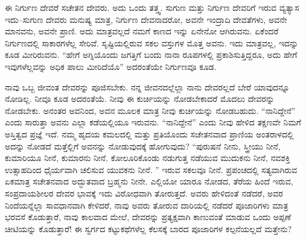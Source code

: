 \newpage

ಈ ನಿರ್ಗುಣ ದೇವರೆ ಸಚೇತನ ದೇವರು. ಅದು ಒಂದು ತತ್ತ್ವ. ಸುಗುಣ ಮತ್ತು ನಿರ್ಗುಣ ದೇವರಿಗೆ ಇರುವ ವ್ಯತ್ಯಾಸ ಇದು–ಸುಗುಣ ದೇವರು ಮನುಷ್ಯ ಮಾತ್ರ, ನಿರ್ಗುಣ ದೇವನಾದರೋ, ಅವನೇ ಇಂದ್ರಾದಿ ದೇವತೆಗಳು, ಅವನೇ ಮಾನವನು, ಅವನೇ ಪ್ರಾಣಿ. ಅದು ಮಾತ್ರವಲ್ಲದೆ ನಮಗೆ ಕಾಣದ ಇನ್ನು ಏನೇನೋ ಆಗಿರುವನು. ಏಕೆಂದರೆ ನಿರ್ಗುಣದಲ್ಲಿ ಸಾಕಾರಗಳೆಲ್ಲ ಸೇರಿವೆ. ಸೃಷ್ಟಿಯಲ್ಲಿರುವ ಸಕಲ ವಸ್ತುಗಳ ಮೊತ್ತ ಅವನು. ಇದು ಮಾತ್ರವಲ್ಲ, ಇದನ್ನು ಕೂಡ ಮೀರಿರುವನು. “ಹೇಗೆ ಅಗ್ನಿಯೊಂದು ಜಗತ್ತಿಗೆ ಬಂದು ನಾನಾ ರೂಪಗಳಲ್ಲಿ ಪ್ರಕಾಶಿಸುತ್ತಿದ್ದರೂ, ಅದು ಹೇಗೆ ಇವುಗಳೆಲ್ಲವನ್ನು ಅಧಿಕ ಪಾಲು ಮೀರಿದೆಯೊ” ಅದರಂತೆಯೇ ನಿರ್ಗುಣವೂ ಕೂಡ. 

\vskip 6pt

ನಾವು ಒಬ್ಬ ಜೀವಂತ ದೇವರನ್ನು ಪೂಜಿಸಬೇಕು. ನನ್ನ ಜೀವನದಲ್ಲೆಲ್ಲಾ ನಾನು ದೇವರಲ್ಲದೆ ಬೇರೆ ಯಾವುದನ್ನೂ ನೋಡಿಲ್ಲ. ನೀವೂ ಕೂಡ ಅದರಂತೆಯೆ. ನೀವು ಈ ಕುರ್ಚಿಯನ್ನು ನೋಡಬೇಕಾದರೆ ಮೊದಲು ದೇವರನ್ನು ನೋಡಬೇಕು. ಅನಂತರ ಅವನಿಂದ, ಅವನ ಮೂಲಕ ಮಾತ್ರ ನೀವು ಕುರ್ಚಿಯನ್ನು ನೋಡಬಹುದು. “ನಾನಿದ್ದೇನೆ” ಎಂದು ಸಾರುತ್ತಾ ಅವನು ಎಲ್ಲಾ ಕಡೆಯಲ್ಲಿಯೂ ಇರುವನು. “ನಾನಿದ್ದೇನೆ” ಎಂದು ನೀವು ಹೇಳಿದ ತಕ್ಷಣವೇ ನಿಮಗೆ ಅಸ್ತಿತ್ವದ ಪ್ರಜ್ಞೆ ಇದೆ. ನಮ್ಮ ಹೃದಯ ಕಮಲದಲ್ಲಿ ಮತ್ತು ಪ್ರತಿಯೊಂದು ಸಚೇತನವಾದ ಪ್ರಾಣಿಯ ಅಂತರಾಳದಲ್ಲಿ ಅದನ್ನು ನೋಡದೆ ಮತ್ತೆಲ್ಲಿಗೆ ಅವನನ್ನು ನೋಡುವುದಕ್ಕೆ ಹೋಗುವುದು? “ಪುರುಷನೆ ನೀನು, ಸ್ತ್ರೀಯು ನೀನೆ, ಕುಮಾರಿಯೂ ನೀನೆ, ಕುಮಾರನು ನೀನೆ. ಕೋಲೂರಿಕೊಂಡು ನಡುಗುತ್ತ ನಡೆಯುವ ಮುದುಕನು ನೀನೆ, ನವಶಕ್ತಿ ಉತ್ಸಾಹದಿಂದ ಧೈರ್ಯವಾಗಿ ಚಲಿಸುವ ಯುವಕನು ನೀನೆ. ” ಇರುವ ಸಕಲವೂ ನೀನೆ. ಪ್ರಪಂಚದಲ್ಲಿ ಸತ್ಯವಾಗಿರುವ ಏಕಮಾತ್ರ ಸಚೇತನವಾದ ಅದ್ಭುತವಾದ ಬ್ರಹ್ಮನು ನೀನೇ. ಎಲ್ಲಿಯೋ ಯಾರೂ ನೋಡದ, ತೆರೆಯ ಹಿಂದೆ ಇರುವ, ಸಂಪ್ರದಾಯಶೀಲರ ದೇವರ ಭಾವಕ್ಕೆ ಇದು ವಿರೋಧವಾಗಿ ತೋರುತ್ತದೆ. ಅವರು ಹೇಳಿದಂತೆ ನಡೆದರೆ, ಅವರ ನಿಂದೆಯನ್ನೆಲ್ಲಾ ಸಾವಧಾನವಾಗಿ ಕೇಳಿದರೆ, ನಾವು ಅವರು ತೋರುವ ದಾರಿಯಲ್ಲಿ ನಡೆದರೆ ಪೂಜಾರಿಗಳು ಮಾತ್ರ ಭರವಸೆ ಕೊಡುತ್ತಾರೆ, ನಾವು ಕಾಲವಾದ ಮೇಲೆ, ದೇವರನ್ನು ಪ್ರತ್ಯಕ್ಷವಾಗಿ ಕಾಣುವಂತೆ ಮಾಡುವ ಒಂದು ಅಪ್ಪಣೆ ಚೀಟಿಯನ್ನು ಕೊಡುತ್ತಾರೆ! ಈ ಸ್ವರ್ಗದ ಕಟ್ಟುಕಥೆಗಳೆಲ್ಲ ಕೆಲಸಕ್ಕೆ ಬಾರದ ಪೂಜಾರಿಗಳ ಕಲ್ಪನೆಯಲ್ಲದೆ ಮತ್ತೇನು?

\vskip 6pt

